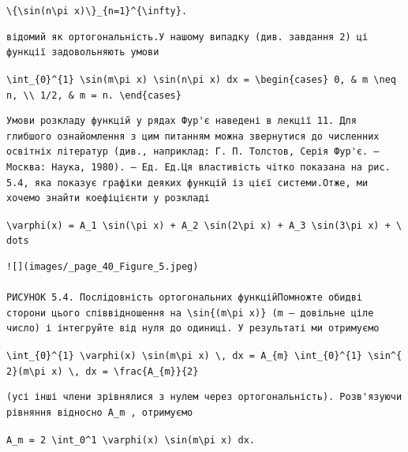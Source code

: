 \documentclass[
  ukrainian,
]{article}
\begin{document}
\texttt{\textbackslash{}\{\textbackslash{}sin(n\textbackslash{}pi\ x)\textbackslash{}\}\_\{n=1\}\^{}\{\textbackslash{}infty\}.}

\begin{verbatim}
відомий як ортогональність.У нашому випадку (див. завдання 2) ці функції задовольняють умови
\end{verbatim}

\texttt{\textbackslash{}int\_\{0\}\^{}\{1\}\ \textbackslash{}sin(m\textbackslash{}pi\ x)\ \textbackslash{}sin(n\textbackslash{}pi\ x)\ dx\ =\ \textbackslash{}begin\{cases\}\ 0,\ \&\ m\ \textbackslash{}neq\ n,\ \textbackslash{}\textbackslash{}\ 1/2,\ \&\ m\ =\ n.\ \textbackslash{}end\{cases\}}

\begin{verbatim}
Умови розкладу функцій у рядах Фур'є наведені в лекції 11. Для глибшого ознайомлення з цим питанням можна звернутися до численних освітніх літератур (див., наприклад: Г. П. Толстов, Серія Фур'є. — Москва: Наука, 1980). — Ед. Ед.Ця властивість чітко показана на рис. 5.4, яка показує графіки деяких функцій із цієї системи.Отже, ми хочемо знайти коефіцієнти у розкладі
\end{verbatim}

\texttt{\textbackslash{}varphi(x)\ =\ A\_1\ \textbackslash{}sin(\textbackslash{}pi\ x)\ +\ A\_2\ \textbackslash{}sin(2\textbackslash{}pi\ x)\ +\ A\_3\ \textbackslash{}sin(3\textbackslash{}pi\ x)\ +\ \textbackslash{}dots}

\begin{verbatim}
![](images/_page_40_Figure_5.jpeg)

РИСУНОК 5.4. Послідовність ортогональних функційПомножте обидві сторони цього співвідношення на \sin{(m\pi x)} (m — довільне ціле число) і інтегруйте від нуля до одиниці. У результаті ми отримуємо
\end{verbatim}

\texttt{\textbackslash{}int\_\{0\}\^{}\{1\}\ \textbackslash{}varphi(x)\ \textbackslash{}sin(m\textbackslash{}pi\ x)\ \textbackslash{},\ dx\ =\ A\_\{m\}\ \textbackslash{}int\_\{0\}\^{}\{1\}\ \textbackslash{}sin\^{}\{2\}(m\textbackslash{}pi\ x)\ \textbackslash{},\ dx\ =\ \textbackslash{}frac\{A\_\{m\}\}\{2\}}

\begin{verbatim}
(усі інші члени зрівнялися з нулем через ортогональність). Розв'язуючи рівняння відносно A_m , отримуємо
\end{verbatim}

\texttt{A\_m\ =\ 2\ \textbackslash{}int\_0\^{}1\ \textbackslash{}varphi(x)\ \textbackslash{}sin(m\textbackslash{}pi\ x)\ dx.}
\end{document}

